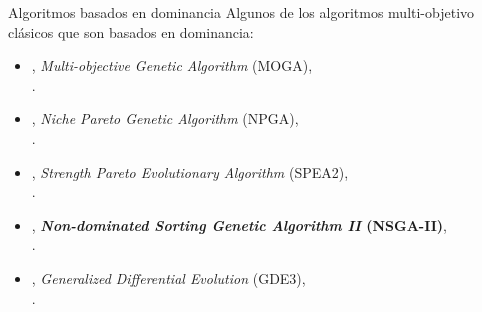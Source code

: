 \documentclass{beamer}
\begin{document}
\begin{frame}{Algoritmos basados en dominancia}
Algunos de los algoritmos multi-objetivo clásicos que son basados en dominancia:
\begin{itemize}
\scriptsize
    \item \citeyear{Joel:MOGA}, \textit{Multi-objective Genetic Algorithm} (MOGA), \\ \citeauthor{Joel:MOGA}.
    \item \citeyear{Joel:NPGA}, \textit{Niche Pareto Genetic Algorithm} (NPGA), \\ \citeauthor{Joel:NPGA}.
    \item \citeyear{zitzler2001spea2}, \textit{Strength Pareto Evolutionary Algorithm} (SPEA2), \\ \citeauthor{zitzler2001spea2}.
    \item \citeyear{Joel:NSGAII},  \textbf{\textit{Non-dominated Sorting Genetic Algorithm II} (NSGA-II)}, \\ \citeauthor{Joel:NSGAII}.
    \item \citeyear{Joel:GDE3}, \textit{Generalized Differential Evolution} (GDE3), \\ \citeauthor{Joel:GDE3}.
\end{itemize}
\end{frame}
\end{document}
